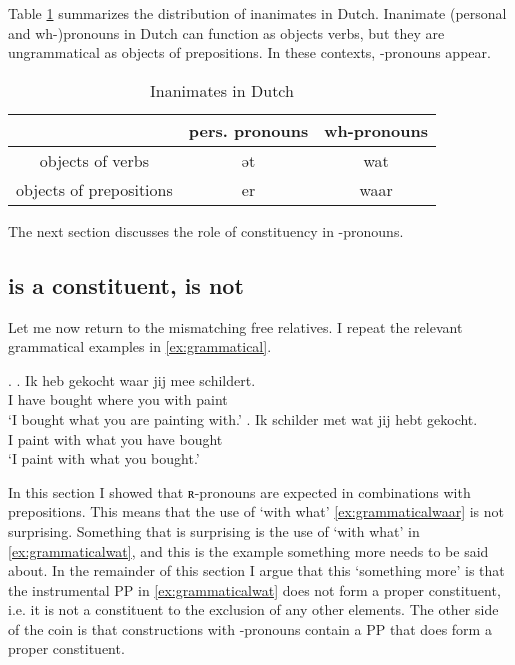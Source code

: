 \documentclass{article}
\begin{document}
Table \ref{tbl:inanimates} summarizes the distribution of inanimates in Dutch. Inanimate (personal and wh-)pronouns in Dutch can function as objects verbs, but they are ungrammatical as objects of prepositions. In these contexts, -pronouns appear.

\begin{table}[ht]\label{tbl:inanimates}
	\center
	\caption {Inanimates in Dutch}
	\begin{minipage}{0.7\linewidth}
		\begin{tabularx}{\textwidth}{ccc}
		\toprule
                        & pers. pronouns & wh-pronouns \\
  	\midrule
objects of verbs        & ət             & wat         \\
objects of prepositions & er             & waar        \\
\bottomrule
\end{tabularx}
\end{minipage}
\end{table}

The next section discusses the role of constituency in -pronouns.


\subsection{ is a constituent,  is not}

Let me now return to the mismatching free relatives. I repeat the relevant grammatical examples in \ref{ex:grammatical}.

\ex.\label{ex:grammatical}
\ag. Ik heb gekocht waar jij mee schildert.\\
 I have bought where you with paint\\
 `I bought what you are painting with.'\label{ex:grammaticalwaar}
\bg. Ik schilder met wat jij hebt gekocht.\\
 I paint with what you have bought\\
 `I paint with what you bought.'\label{ex:grammaticalwat}

In this section I showed that ʀ-pronouns are expected in combinations with prepositions. This means that the use of  `with what' \ref{ex:grammaticalwaar} is not surprising. Something that is surprising is the use of  `with what' in \ref{ex:grammaticalwat}, and this is the example something more needs to be said about. In the remainder of this section I argue that this `something more' is that the instrumental PP in \ref{ex:grammaticalwat} does not form a proper constituent, i.e. it is not a constituent to the exclusion of any other elements. The other side of the coin is that constructions with -pronouns contain a PP that does form a proper constituent.
\end{document}
